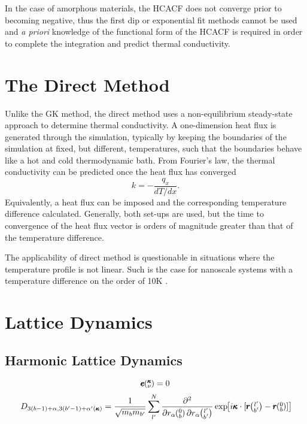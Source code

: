 In the case of amorphous materials, the HCACF does not converge prior to becoming negative, thus the first dip or exponential fit methods cannot be used and \textit{a priori} knowledge of the functional form of the HCACF is required in order to complete the integration and predict thermal conductivity.

\section{The Direct Method}

Unlike the GK method, the direct method uses a non-equilibrium steady-state approach to determine thermal conductivity. A one-dimension heat flux is generated through the simulation, typically by keeping the boundaries of the simulation at fixed, but different, temperatures, such that the boundaries behave like a hot and cold thermodynamic bath. From Fourier's law, the thermal conductivity can be predicted once the heat flux has converged
%
\begin{equation}
k=-\frac{q_x}{dT/dx}.
\end{equation}
%
Equivalently, a heat flux can be imposed and the corresponding temperature difference calculated. Generally, both set-ups are used, but the time to convergence of the heat flux vector is orders of magnitude greater than that of the temperature difference.

The applicability of direct method is questionable in situations where the temperature profile is not linear. Such is the case for nanoscale systems with a temperature difference on the order of 10K \cite{mcgaugheythesis}.

\section{Lattice Dynamics}

\subsection{Harmonic Lattice Dynamics}
%
\begin{equation}
[D(\pmb{\kappa})-I\omega^2\kv]\pmb{e}\kv = 0
\end{equation}
%
\begin{equation}
D_{3(b-1)+\alpha,3(b'-1)+\alpha'(\pmb{\kappa})}=\frac{1}{\sqrt{m_bm_{b'}}}\sum_{l'}^N\frac{\partial^2}{\partial r_\alpha \Ob \partial r_\alpha \lbp} \EXP{i\pmb{\kappa}\cdot [\pmb{r}\lbp-\pmb{r}\Ob]}
\end{equation}

